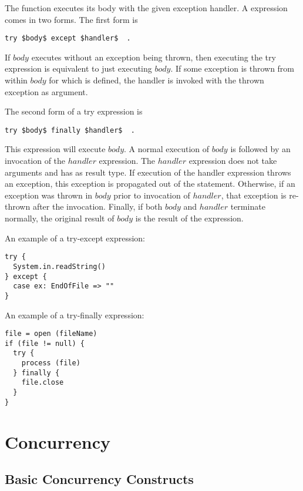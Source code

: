 \documentclass[11pt]{report}
\begin{document}
The \verb@try@ function executes its body with the given exception
handler. A \verb@try@ expression comes in two forms. The first form is

\begin{verbatim}
try $body$ except $handler$  .
\end{verbatim}

If $body$ executes without an exception being thrown, then executing
the try expression is equivalent to just executing $body$. If some
exception is thrown from within $body$ for which \verb@handler@ is defined,
the handler is invoked with the thrown exception as argument.

The second form of a try expression is

\begin{verbatim}
try $body$ finally $handler$  .
\end{verbatim}

This expression will execute $body$. A normal execution of $body$ is
followed by an invocation of the $handler$ expression.  The $handler$
expression does not take arguments and has \verb@Unit@ as result type.
If execution of the handler expression throws an exception, this
exception is propagated out of the \verb@try@ statement.  Otherwise,
if an exception was thrown in $body$ prior to invocation of $handler$,
that exception is re-thrown after the invocation. Finally, if both
$body$ and $handler$ terminate normally, the original result of
$body$ is the result of the \verb@try@ expression.

\example An example of a try-except expression:

\begin{verbatim}
try {
  System.in.readString()
} except {
  case ex: EndOfFile => ""
}
\end{verbatim}

\example An example of a try-finally expression:

\begin{verbatim}
file = open (fileName)
if (file != null) {
  try {
    process (file)
  } finally {
    file.close
  }
}
\end{verbatim}

\section{Concurrency}
\label{sec:concurrency}

\subsection{Basic Concurrency Constructs}
\end{document}

